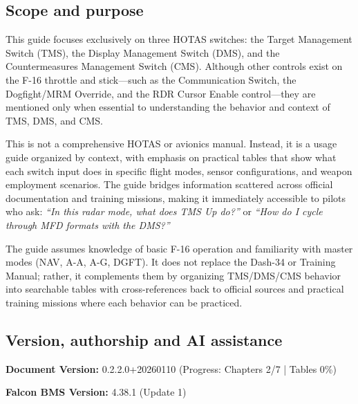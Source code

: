 \documentclass[11pt,a4paper]{article}
\newcommand{\docversion}{0.2.2.0}
\newcommand{\docbuild}{20260110}
\newcommand{\chapterscompletedof}{2/7}
\newcommand{\tablesfilledpct}{0\%}
\newcommand{\fulldocversion}{\docversion+\docbuild}
\begin{document}

\subsection{Scope and purpose}

This guide focuses exclusively on three HOTAS switches: the Target Management Switch (TMS), the Display Management Switch (DMS), and the Countermeasures Management Switch (CMS). Although other controls exist on the F-16 throttle and stick---such as the Communication Switch, the Dogfight/MRM Override, and the RDR Cursor Enable control---they are mentioned only when essential to understanding the behavior and context of TMS, DMS, and CMS.

This is not a comprehensive HOTAS or avionics manual. Instead, it is a usage guide organized by context, with emphasis on practical tables that show what each switch input does in specific flight modes, sensor configurations, and weapon employment scenarios. The guide bridges information scattered across official documentation and training missions, making it immediately accessible to pilots who ask: \emph{``In this radar mode, what does TMS Up do?''} or \emph{``How do I cycle through MFD formats with the DMS?''}

The guide assumes knowledge of basic F-16 operation and familiarity with master modes (NAV, A-A, A-G, DGFT). It does not replace the Dash-34 or Training Manual; rather, it complements them by organizing TMS/DMS/CMS behavior into searchable tables with cross-references back to official sources and practical training missions where each behavior can be practiced.


\subsection{Version, authorship and AI assistance}

\textbf{Document Version:} \fulldocversion{} (Progress: Chapters \chapterscompletedof{} | Tables \tablesfilledpct)

\textbf{Falcon BMS Version:} 4.38.1 (Update 1)
\end{document}
